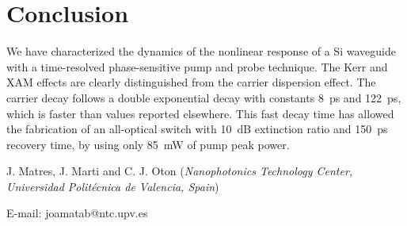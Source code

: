 \documentclass[twocolumn]{el-author}
\begin{document}
\section{Conclusion}
We have characterized the dynamics of the nonlinear response of a Si waveguide with a time-resolved phase-sensitive pump and probe technique. The Kerr and XAM effects are clearly distinguished from the carrier dispersion effect. The carrier decay follows a double exponential decay with constants 8~ps and 122~ps, which is faster than values reported elsewhere. This fast decay time has allowed the fabrication of an all-optical switch with 10~dB extinction ratio and 150~ps recovery time, by using only 85~mW of pump peak power.

\vskip3pt

\vskip5pt

\noindent J. Matres, J. Marti and C. J. Oton (\textit{Nanophotonics Technology Center, Universidad Polit\'ecnica de Valencia, Spain})
\vskip3pt

\noindent E-mail: joamatab@ntc.upv.es
\end{document}
